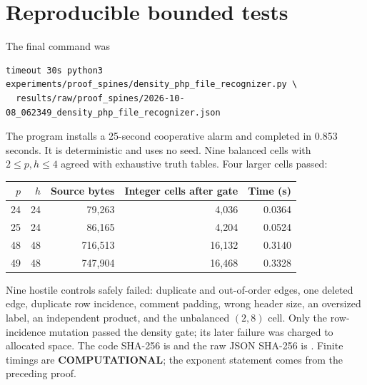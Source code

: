 \documentclass[11pt]{article}
\begin{document}
\section{Reproducible bounded tests}
The final command was
\begin{verbatim}
timeout 30s python3 experiments/proof_spines/density_php_file_recognizer.py \
  results/raw/proof_spines/2026-10-08_062349_density_php_file_recognizer.json
\end{verbatim}
The program installs a 25-second cooperative alarm and completed in 0.853
seconds.  It is deterministic and uses no seed.  Nine balanced cells with
$2\le p,h\le4$ agreed with exhaustive truth tables.  Four larger cells passed:
\begin{center}\small
\begin{tabular}{rrrrr}
\toprule
$p$ & $h$ & Source bytes & Integer cells after gate & Time (s)\\
\midrule
24&24&79,263&4,036&0.0364\\
25&24&86,165&4,204&0.0524\\
48&48&716,513&16,132&0.3140\\
49&48&747,904&16,468&0.3328\\
\bottomrule
\end{tabular}
\end{center}
Nine hostile controls safely failed: duplicate and out-of-order edges, one
deleted edge, duplicate row incidence, comment padding, wrong header size,
an oversized label, an independent product, and the unbalanced $(2,8)$ cell.
Only the row-incidence mutation passed the density gate; its later failure was
charged to allocated space.  The code SHA-256 is
and the raw JSON SHA-256 is
.
Finite timings are \textbf{COMPUTATIONAL}; the exponent statement comes from
the preceding proof.
\end{document}
